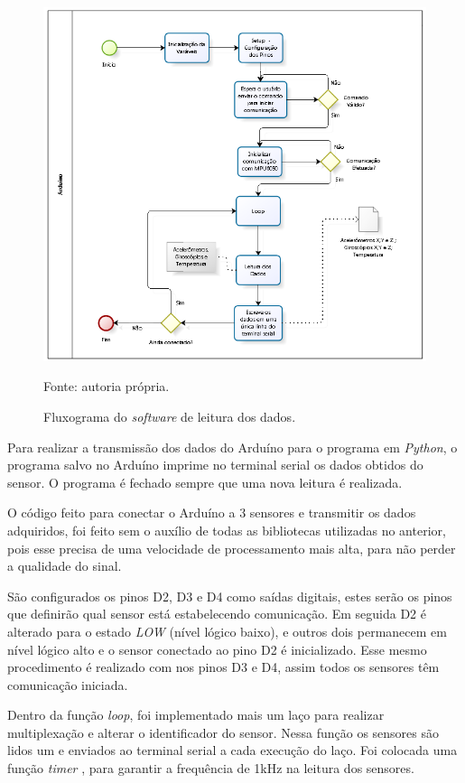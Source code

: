 		\begin{figure}[h]
			\centering
			\includegraphics[keepaspectratio=true,scale=0.9]{figuras/diagrama_embarcado.PNG}
			\caption{Fluxograma do \textit{software} de leitura dos dados. }
			Fonte: autoria própria. 
			\label{fluxograma_arduino}	
		\end{figure}
		
		Para realizar a transmissão dos dados do Arduíno para o programa em \textit{Python}, o programa salvo no Arduíno imprime no terminal serial os dados obtidos do sensor. O programa é fechado sempre que uma nova leitura é realizada.
		
		O código feito para conectar o Arduíno a 3 sensores e transmitir os dados adquiridos, foi feito sem o auxílio de todas as bibliotecas utilizadas no anterior, pois esse precisa de uma velocidade de processamento mais alta, para não perder a qualidade do sinal. 
		
		São configurados os pinos D2, D3 e D4 como saídas digitais, estes serão os pinos que definirão qual sensor está estabelecendo comunicação. Em seguida D2 é alterado para o estado \textit{LOW } (nível lógico baixo), e outros dois permanecem em nível lógico alto e o sensor conectado ao pino D2 é inicializado. Esse mesmo procedimento é realizado com nos pinos D3 e D4, assim todos os sensores têm comunicação iniciada.
		
		Dentro da função \textit{loop}, foi implementado mais um laço  para realizar multiplexação e alterar o identificador do sensor. Nessa função os sensores são lidos um e enviados ao terminal serial a cada execução do laço. Foi colocada uma função \textit{timer} , para garantir a frequência de 1kHz na leitura dos sensores.

